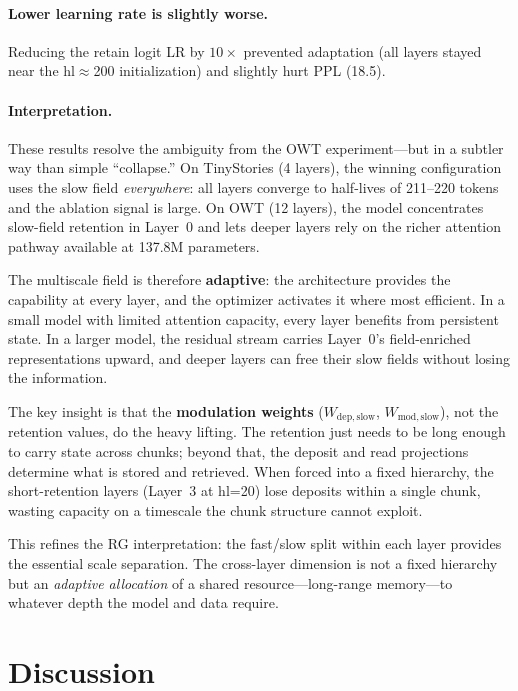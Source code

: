 \documentclass[11pt,a4paper]{article}
\begin{document}
\paragraph{Lower learning rate is slightly worse.}  Reducing the
retain logit LR by $10\times$ prevented adaptation (all layers stayed
near the hl$\approx$200 initialization) and slightly hurt PPL (18.5).

\paragraph{Interpretation.}  These results resolve the ambiguity
from the OWT experiment---but in a subtler way than simple
``collapse.''  On TinyStories (4 layers), the winning configuration
uses the slow field \emph{everywhere}: all layers converge to
half-lives of 211--220 tokens and the ablation signal is large.  On
OWT (12 layers), the model concentrates slow-field retention in
Layer~0 and lets deeper layers rely on the richer attention pathway
available at 137.8M parameters.

The multiscale field is therefore \textbf{adaptive}: the architecture
provides the capability at every layer, and the optimizer activates
it where most efficient.  In a small model with limited attention
capacity, every layer benefits from persistent state.  In a larger
model, the residual stream carries Layer~0's field-enriched
representations upward, and deeper layers can free their slow fields
without losing the information.

The key insight is that the \textbf{modulation weights}
($W_{\mathrm{dep,slow}}$, $W_{\mathrm{mod,slow}}$), not the
retention values, do the heavy lifting.  The retention just needs to
be long enough to carry state across chunks; beyond that, the
deposit and read projections determine what is stored and retrieved.
When forced into a fixed hierarchy, the short-retention layers
(Layer~3 at hl=20) lose deposits within a single chunk, wasting
capacity on a timescale the chunk structure cannot exploit.

This refines the RG interpretation: the fast/slow split within each
layer provides the essential scale separation.  The cross-layer
dimension is not a fixed hierarchy but an \emph{adaptive allocation}
of a shared resource---long-range memory---to whatever depth the
model and data require.


\section{Discussion}
\label{sec:discussion}
\end{document}
